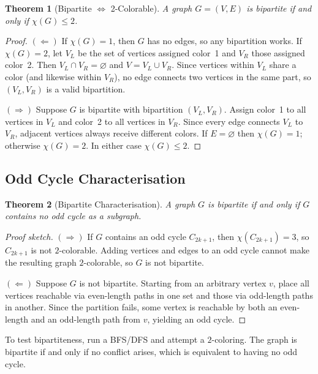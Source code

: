 \documentclass[11pt, a4paper, notitlepage]{report}
\newtheorem{theorem}{Theorem}[section]
\theoremstyle{definition}
\theoremstyle{remark}
\begin{document}
\begin{theorem}[Bipartite $\iff$ 2-Colorable]
\label{thm:bipartite-coloring}
A graph $G = (V, E)$ is bipartite if and only if $\chi(G) \leq 2$.
\end{theorem}

\begin{proof}
$(\Leftarrow)$\; If $\chi(G) = 1$, then $G$ has no edges, so any bipartition works. If $\chi(G) = 2$, let $V_L$ be the set of vertices assigned color~1 and $V_R$ those assigned color~2. Then $V_L \cap V_R = \varnothing$ and $V = V_L \cup V_R$. Since vertices within $V_L$ share a color (and likewise within $V_R$), no edge connects two vertices in the same part, so $(V_L, V_R)$ is a valid bipartition.

$(\Rightarrow)$\; Suppose $G$ is bipartite with bipartition $(V_L, V_R)$. Assign color~1 to all vertices in $V_L$ and color~2 to all vertices in $V_R$. Since every edge connects $V_L$ to $V_R$, adjacent vertices always receive different colors. If $E = \varnothing$ then $\chi(G) = 1$; otherwise $\chi(G) = 2$. In either case $\chi(G) \leq 2$.
\end{proof}

\subsection{Odd Cycle Characterisation}
\label{subsec:odd-cycle}

\begin{theorem}[Bipartite Characterisation]
\label{thm:bipartite-odd-cycle}
A graph $G$ is bipartite if and only if $G$ contains no odd cycle as a subgraph.
\end{theorem}

\begin{proof}[Proof sketch]
$(\Rightarrow)$\; If $G$ contains an odd cycle $C_{2k+1}$, then $\chi(C_{2k+1}) = 3$, so $C_{2k+1}$ is not $2$-colorable. Adding vertices and edges to an odd cycle cannot make the resulting graph $2$-colorable, so $G$ is not bipartite.

$(\Leftarrow)$\; Suppose $G$ is not bipartite. Starting from an arbitrary vertex $v$, place all vertices reachable via even-length paths in one set and those via odd-length paths in another. Since the partition fails, some vertex is reachable by both an even-length and an odd-length path from $v$, yielding an odd cycle.
\end{proof}

\begin{keyresult}[title={Key Result: Bipartite Testing}]
To test bipartiteness, run a BFS/DFS and attempt a $2$-coloring. The graph is bipartite if and only if no conflict arises, which is equivalent to having no odd cycle.
\end{keyresult}
\end{document}

